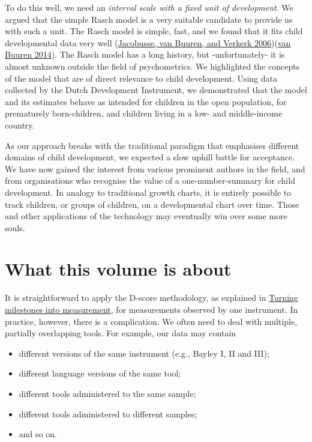 \documentclass[
]{book}
\providecommand{\tightlist}{%
  \setlength{\itemsep}{0pt}\setlength{\parskip}{0pt}}
\begin{document}
To do this well, we need an \emph{interval scale with a fixed unit of development}. We argued that the simple Rasch model is a very suitable candidate to provide us with such a unit. The Rasch model is simple, fast, and we found that it fits child developmental data very well (\protect\hyperlink{ref-jacobusse2006}{Jacobusse, van Buuren, and Verkerk 2006})(\protect\hyperlink{ref-vanbuuren2014}{van Buuren 2014}). The Rasch model has a long history, but -unfortunately- it is almost unknown outside the field of psychometrics. We highlighted the concepts of the model that are of direct relevance to child development. Using data collected by the Dutch Development Instrument, we demonstrated that the model and its estimates behave as intended for children in the open population, for prematurely born-children, and children living in a low- and middle-income country.

As our approach breaks with the traditional paradigm that emphasises different domains of child development, we expected a slow uphill battle for acceptance. We have now gained the interest from various prominent authors in the field, and from organisations who recognise the value of a one-number-summary for child development. In analogy to traditional growth charts, it is entirely possible to track children, or groups of children, on a developmental chart over time. Those and other applications of the technology may eventually win over some more souls.

\hypertarget{sec:thisvolume}{%
\section{What this volume is about}\label{sec:thisvolume}}

It is straightforward to apply the D-score methodology, as explained in \href{https://d-score.org/dbook1}{Turning milestones into measurement}, for measurements observed by one instrument. In practice, however, there is a complication. We often need to deal with multiple, partially overlapping tools. For example, our data may contain

\begin{itemize}
\tightlist
\item
  different versions of the same instrument (e.g., Bayley I, II and III);
\item
  different language versions of the same tool;
\item
  different tools administered to the same sample;
\item
  different tools administered to different samples;
\item
  and so on.
\end{itemize}
\end{document}
